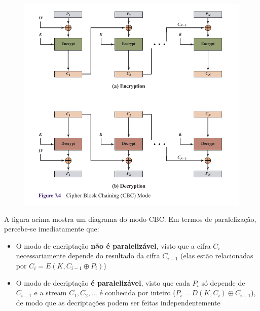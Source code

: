 \documentclass{article}
\begin{document}
\FloatBarrier
\begin{figure}[!ht]
    \begin{center}
        \includegraphics[width=\textwidth]{images/cbc_mode.png}
    \end{center}
\end{figure} 

A figura acima mostra um diagrama do modo CBC. Em termos de paralelização, percebe-se imediatamente que:

\begin{itemize}
    \item O modo de encriptação \textbf{não é paralelizável}, visto que a cifra $C_i$ necessariamente depende do resultado da cifra $C_{i-1}$ (elas estão relacionadas por $C_i = E(K, C_{i-1} \oplus P_i)$)
    \item O modo de decriptação \textbf{é paralelizável}, visto que cada $P_i$ só depende de $C_{i-1}$ e a stream $C_1, C_2, ...$ é conhecida por inteiro ($P_i = D(K, C_i) \oplus C_{i-1}$), de modo que as decriptações podem ser feitas independentemente
\end{itemize}
\end{document}
